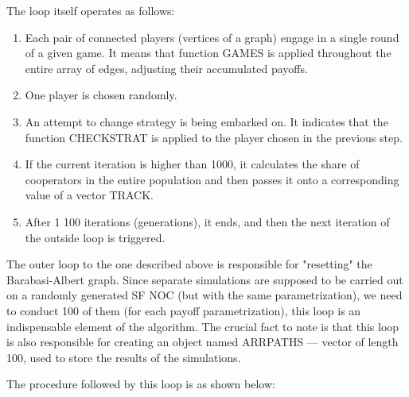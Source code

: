\documentclass[english, twoside, 12pt, a4paper]{article}
\theoremstyle{definition}
\theoremstyle{plain}
\theoremstyle{remark}
\begin{document}
The loop itself operates as follows:

\begin{enumerate}
  \item Each pair of connected players (vertices of a graph) engage in a single round of a given game. It means that function GAMES is applied throughout the entire array of edges, adjusting their accumulated payoffs.
  \item One player is chosen randomly.
  \item An attempt to change strategy is being embarked on. It indicates that the function CHECKSTRAT is applied to the player chosen in the previous step.
  \item If the current iteration is higher than 1000, it calculates the share of cooperators in the entire population and then passes it onto a corresponding value of a vector TRACK.
  \item After 1 100 iterations (generations), it ends, and then the next iteration of the outside loop is triggered.
\end{enumerate}

The outer loop to the one described above is responsible for "resetting" the Barabasi-Albert graph. Since separate simulations are supposed to be carried out 
on a randomly generated SF NOC (but with the same parametrization), we need to conduct 100 of them (for each payoff parametrization), this loop is an indispensable
element of the algorithm. The crucial fact to note is that this loop is also responsible for creating an object named ARRPATHS --- vector of length 100, used to 
store the results of the simulations.

The procedure followed by this loop is as shown below:
\end{document}
